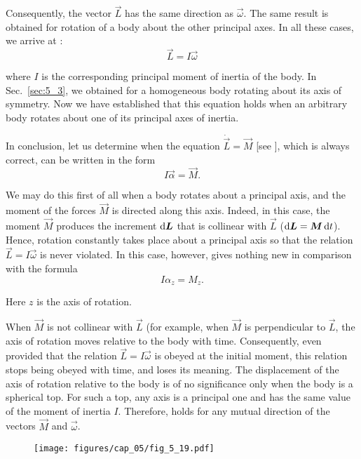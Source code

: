 \noindent
Consequently, the vector $\vec{L}$ has the same direction as $\vec{\omega}$. The same result is obtained for rotation of a body about the other principal axes. In all these cases, we arrive at :
\begin{equation*}
\vec{L} = I\vec{\omega}
\end{equation*}

\noindent
where $I$ is the corresponding principal moment of inertia of the body. In Sec.~\ref{sec:5_3}, we obtained  for a homogeneous body rotating about its axis of symmetry. Now we have established that this equation holds when an arbitrary body rotates about one of its principal axes of inertia.

In conclusion, let us determine when the equation $\dot{\vec{L}}=\vec{M}$ [see ], which is always correct, can be written in the form
\begin{equation}\label{eq:5_44}
I \vec{\alpha} = \vec{M}.
\end{equation}

We may do this first of all when a body rotates about a principal axis, and the moment of the forces $\vec{M}$ is directed along this axis. Indeed, in this case, the moment $\vec{M}$ produces the increment $\mathrm{d}\boldsymbol{L}$ that is collinear with $\vec{L}$ ($\mathrm{d}\boldsymbol{L}=\boldsymbol{M}\,\mathrm{d} t$). Hence, rotation constantly takes place about a principal axis so that the relation $\vec{L}=I\vec{\omega}$ is never violated. In this case, however,  gives nothing new in comparison with the formula
\begin{equation}\label{eq:5_45}
	I\alpha_z = M_z.
\end{equation}

\noindent
Here $z$ is the axis of rotation.

When $\vec{M}$ is not collinear with $\vec{L}$ (for example, when $\vec{M}$ is perpendicular to $\vec{L}$, the axis of rotation moves relative to the body with time. Consequently, even provided that the relation $\vec{L}=I\vec{\omega}$ is obeyed at the initial moment, this relation stops being obeyed with time, and  loses its meaning. The displacement of the axis of rotation relative to the body is of no significance only when the body is a spherical top. For such a top, any axis is a principal one and has the same value of the moment of inertia $I$. Therefore,  holds for any mutual direction of the vectors $\vec{M}$ and $\vec{\omega}$.

\begin{figure}[t]
	\begin{center}
		\texttt{[image: figures/cap\_05/fig\_5\_19.pdf]}
		\caption[]{}
		\label{fig:5_19}
	\end{center}
	\vspace{-0.6cm}
\end{figure}

